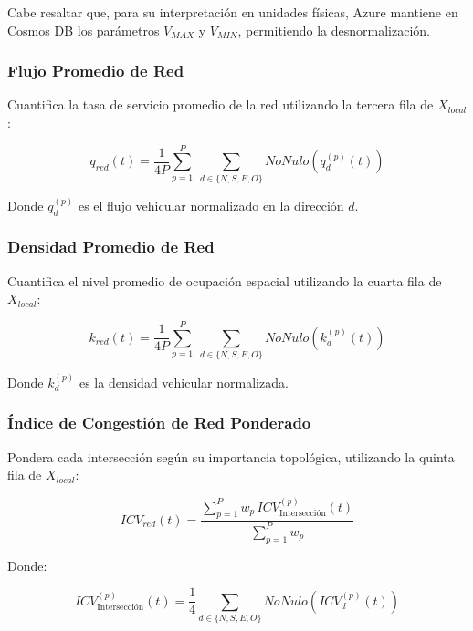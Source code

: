 \documentclass[12pt,a4paper,oneside]{report}
\begin{document}
Cabe resaltar que, para su interpretación en unidades físicas, Azure mantiene en Cosmos DB los parámetros \(V_{MAX}\) y \(V_{MIN}\), permitiendo la desnormalización.

\subsubsection{Flujo Promedio de Red}

Cuantifica la tasa de servicio promedio de la red utilizando la tercera fila de \(X_{local}\):

\begin{equation}
q_{red}(t) = \frac{1}{4P}\sum_{p = 1}^{P}\ \sum_{d \in \{N, S, E, O\}} NoNulo\!\left(q_{d}^{(p)}(t)\right)
\label{eq:qred}
\end{equation}

Donde \(q_{d}^{(p)}\) es el flujo vehicular normalizado en la dirección \(d\).

\subsubsection{Densidad Promedio de Red}

Cuantifica el nivel promedio de ocupación espacial utilizando la cuarta fila de \(X_{local}\):

\begin{equation}
k_{red}(t) = \frac{1}{4P}\sum_{p = 1}^{P}\ \sum_{d \in \{N, S, E, O\}} NoNulo\!\left(k_{d}^{(p)}(t)\right)
\label{eq:kred}
\end{equation}

Donde \(k_{d}^{(p)}\) es la densidad vehicular normalizada.

\subsubsection{Índice de Congestión de Red Ponderado}

Pondera cada intersección según su importancia topológica, utilizando la quinta fila de \(X_{local}\):

\begin{equation}
ICV_{red}(t) = \frac{\displaystyle\sum_{p = 1}^{P} w_{p}\, ICV_{\text{Intersección}}^{(p)}(t)}{\displaystyle\sum_{p = 1}^{P} w_{p}}
\label{eq:icvred}
\end{equation}

Donde:

\begin{equation}
ICV_{\text{Intersección}}^{(p)}(t) = \frac{1}{4}\sum_{d \in \{N, S, E, O\}} NoNulo\!\left(ICV_{d}^{(p)}(t)\right)
\end{equation}
\end{document}
